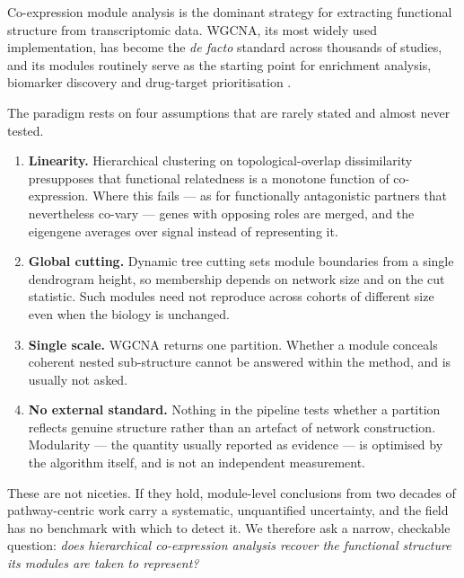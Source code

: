 \documentclass[twocolumn,10pt,letterpaper]{article}
\begin{document}
Co-expression module analysis is the dominant strategy for extracting functional structure
from transcriptomic data. WGCNA, its most widely used implementation, has become the
\emph{de facto} standard across thousands of studies, and its modules routinely serve as the
starting point for enrichment analysis, biomarker discovery and drug-target
prioritisation \citep{langfelder2008wgcna,langfelder2012wgcna,gillis2012guilt}.

The paradigm rests on four assumptions that are rarely stated and almost never tested.

\begin{enumerate}

\item \textbf{Linearity.} Hierarchical clustering on topological-overlap dissimilarity
presupposes that functional relatedness is a monotone function of co-expression. Where this
fails --- as for functionally antagonistic partners that nevertheless co-vary --- genes with
opposing roles are merged, and the eigengene averages over signal instead of representing it.

\item \textbf{Global cutting.} Dynamic tree cutting sets module boundaries from a single
dendrogram height, so membership depends on network size and on the cut statistic. Such
modules need not reproduce across cohorts of different size even when the biology is
unchanged.

\item \textbf{Single scale.} WGCNA returns one partition. Whether a module conceals coherent
nested sub-structure cannot be answered within the method, and is usually not asked.

\item \textbf{No external standard.} Nothing in the pipeline tests whether a partition
reflects genuine structure rather than an artefact of network construction. Modularity ---
the quantity usually reported as evidence --- is optimised by the algorithm itself, and is
not an independent measurement.

\end{enumerate}

These are not niceties. If they hold, module-level conclusions from two decades of
pathway-centric work carry a systematic, unquantified uncertainty, and the field has no
benchmark with which to detect it. We therefore ask a narrow, checkable question:
\emph{does hierarchical co-expression analysis recover the functional structure its modules
are taken to represent?}
\end{document}
